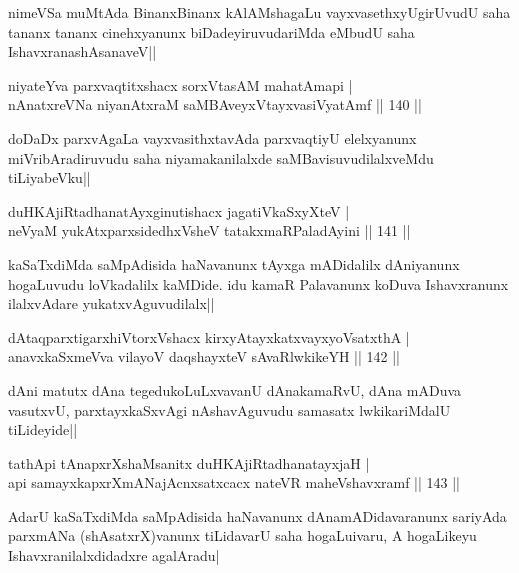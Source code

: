 \begin{artha}
nimeVSa muMtAda BinanxBinanx kAlAMshagaLu vayxvasethxyUgirUvudU saha tananx tananx cinehxyanunx biDadeyiruvudariMda eMbudU saha IshavxranashAsanaveV||
\end{artha}


\begin{shl}
niyateYva parxvaqtitxshacx sorxVtasAM mahatAmapi |\\
nAnatxreVNa niyanAtxraM saMBAveyxVtayxvasiVyatAmf \hfill || 140 ||
\end{shl}

\begin{artha}
doDaDx parxvAgaLa vayxvasithxtavAda parxvaqtiyU elelxyanunx miVribAradiruvudu saha niyamakanilalxde saMBavisuvudilalxveMdu tiLiyabeVku||
\end{artha}

\begin{shl}
duHKAjiRtadhanatAyxginutishacx jagatiVkaSxyXteV |\\
neVyaM yukAtx\s parxsidedhxVsheV tatakxmaRPaladAyini \hfill || 141 ||
\end{shl}

\begin{artha}
kaSaTxdiMda saMpAdisida haNavanunx tAyxga mADidalilx dAniyanunx hogaLuvudu loVkadalilx kaMDide. idu kamaR Palavanunx koDuva Ishavxranunx ilalxvAdare yukatxvAguvudilalx||
\end{artha}


\begin{shl}
dAtaqparxtigarxhiVtorxVshacx kirxyAtayxkatxvayxyoVsatxthA |\\
anavxkaSxmeVva vilayoV daqshayxteV sAvaRlwkikeYH \hfill || 142 ||
\end{shl}

\begin{artha}
dAni matutx dAna tegedukoLuLxvavanU dAnakamaRvU, dAna mADuva vasutxvU, parxtayxkaSxvAgi nAshavAguvudu samasatx lwkikariMdalU tiLideyide||
\end{artha}

\begin{shl}
tathA\s pi tAnapxrXshaMsanitx duHKAjiRtadhanatayxjaH |\\
api samayxkapxrXmANajAcnxsatxcacx nateVR maheVshavxramf \hfill || 143 ||
\end{shl}

\begin{artha}%
AdarU kaSaTxdiMda saMpAdisida haNavanunx dAnamADidavaranunx sariyAda parxmANa (shAsatxrX)vanunx tiLidavarU saha hogaLuivaru, A hogaLikeyu Ishavxranilalxdidadxre agalAradu|
\end{artha}

